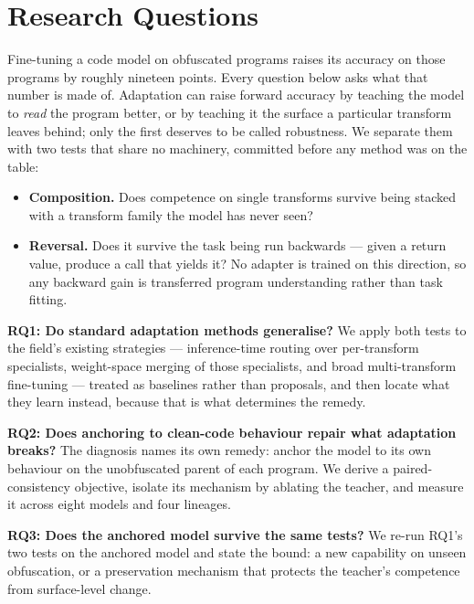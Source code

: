 \section{Research Questions}
\label{sec:rqs}

Fine-tuning a code model on obfuscated programs raises its accuracy on those programs by roughly
nineteen points. Every question below asks what that number is made of. Adaptation can raise forward
accuracy by teaching the model to \emph{read} the program better, or by teaching it the surface a
particular transform leaves behind; only the first deserves to be called robustness. We separate them
with two tests that share no machinery, committed before any method was on the table:
\begin{itemize}[leftmargin=*, topsep=2pt, itemsep=1pt]
  \item \textbf{Composition.} Does competence on single transforms survive being stacked with a
        transform family the model has never seen?
  \item \textbf{Reversal.} Does it survive the task being run backwards --- given a return value,
        produce a call that yields it? No adapter is trained on this direction, so any backward gain
        is transferred program understanding rather than task fitting.
\end{itemize}

\noindent\textbf{RQ1: Do standard adaptation methods generalise?} We apply both tests to the field's
existing strategies --- inference-time routing over per-transform specialists, weight-space merging of
those specialists, and broad multi-transform fine-tuning --- treated as baselines rather than
proposals, and then locate what they learn instead, because that is what determines the remedy.

\noindent\textbf{RQ2: Does anchoring to clean-code behaviour repair what adaptation breaks?} The
diagnosis names its own remedy: anchor the model to its own behaviour on the unobfuscated parent of
each program. We derive a paired-consistency objective, isolate its mechanism by ablating the teacher,
and measure it across eight models and four lineages.

\noindent\textbf{RQ3: Does the anchored model survive the same tests?} We re-run RQ1's two tests on
the anchored model and state the bound: a new capability on unseen obfuscation, or a preservation
mechanism that protects the teacher's competence from surface-level change.
